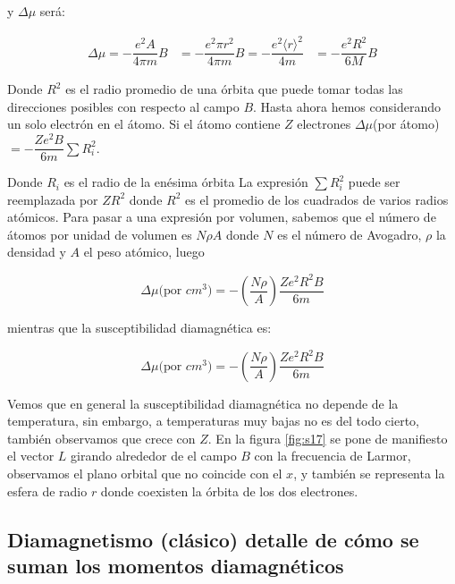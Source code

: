 y $\Delta\mu$ será:

\begin{equation}
\begin{aligned}
\Delta \mu = -\dfrac{e^{2}A}{4\pi m}B &= -\dfrac{e^{2}\pi r^{2} }{4\pi m}B = -\dfrac{e^{2}\langle r \rangle^{2}}{4m} &= -\dfrac{e^{2}R^{2}}{6M}B
\end{aligned}
\end{equation}

Donde $R^{2}$ es el radio promedio de una órbita que puede tomar todas las direcciones posibles con respecto al campo $B$. Hasta ahora hemos considerando un solo electrón en el átomo. Si el átomo contiene $Z$ electrones $\Delta\mu$(por átomo) $=-\dfrac{Ze^{2}B}{6m}\sum R_{i}^{2}$.

Donde $R_{i}$ es el radio de la enésima órbita La expresión $\sum R_{i}^{2}$ puede ser reemplazada por $ZR^{2}$ donde $R^{2}$ es el promedio de los cuadrados de varios radios atómicos. Para pasar a una expresión por volumen, sabemos que el número de átomos por unidad de volumen es $N\rho A$ donde $N$ es el número de Avogadro, $\rho$ la densidad y $A$ el peso atómico, luego

\begin{equation}
	\Delta\mu\text{(por $cm^3$)} =- \left( \dfrac{N\rho}{A}\right) \dfrac{Ze^{2}R^{2}B}{6m}
\end{equation}


mientras que la susceptibilidad diamagnética es:

\begin{equation}
	\Delta\mu\text{(por $cm^3$)} =- \left( \dfrac{N\rho}{A}\right) \dfrac{Ze^{2}R^{2}B}{6m}
\end{equation}

Vemos que en general la susceptibilidad diamagnética no depende de la temperatura, sin embargo, a temperaturas muy bajas no es del todo cierto, también observamos que crece con $Z$. En la figura \ref{fig:s17} se pone de manifiesto el vector $L$ girando alrededor de el campo $B$ con la frecuencia de Larmor, observamos el plano orbital que no coincide con el $x$, y también se representa la esfera de radio $r$ donde coexisten la órbita de los dos electrones.

\subsection{Diamagnetismo (clásico) detalle de cómo se suman los momentos diamagnéticos}

